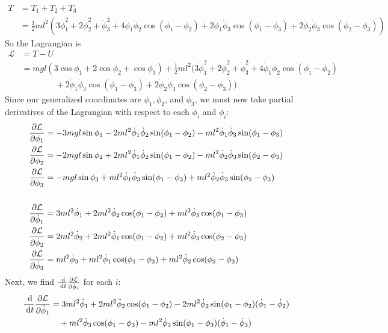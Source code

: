 \documentclass{article}
\renewcommand{\L}{\mathcal{L}}
\begin{document}
\begin{appendices}
\begin{align}
	T &= T_1 + T_2 + T_3 \\
	&= \frac{1}{2}ml^2 \left( 3\dot\phi_1^2+2\dot\phi_2^2+\dot\phi_3^2
	   + 4\dot\phi_1\dot\phi_2\cos(\phi_1-\phi_2)
	   + 2\dot\phi_1\dot\phi_3\cos(\phi_1-\phi_3)
	   + 2\dot\phi_2\dot\phi_3\cos(\phi_2-\phi_3) \right) 
\end{align}
So the Lagrangian is
\begin{align}
	\L &= T - U \\
	&= mgl\left(3\cos\phi_1+2\cos\phi_2+\cos\phi_3 \right) 
	   + \frac{1}{2}ml^2 \bigl( 3\dot\phi_1^2+2\dot\phi_2^2+\dot\phi_3^2
	   + 4\dot\phi_1\dot\phi_2\cos(\phi_1-\phi_2) \\
	&\qquad\qquad + 2\dot\phi_1\dot\phi_3\cos(\phi_1-\phi_3)
	   + 2\dot\phi_2\dot\phi_3\cos(\phi_2-\phi_3) \bigr) 
\end{align}
Since our generalized coordinates are $\phi_1,\phi_2$, and $\phi_3$, we must
now take partial derivatives of the Lagrangian with respect to each $\phi_i$
and $\dot\phi_i$:
\begin{align}
	\pD{\L}{\phi_1} &= -3mgl\sin\phi_1 
		-2ml^2\dot\phi_1\dot\phi_2\sin(\phi_1-\phi_2)
		-ml^2\dot\phi_1\dot\phi_3\sin(\phi_1-\phi_3) \\
	\pD{\L}{\phi_2} &= -2mgl\sin\phi_2 
		+2ml^2\dot\phi_1\dot\phi_2\sin(\phi_1-\phi_2)
		-ml^2\dot\phi_2\dot\phi_3\sin(\phi_2-\phi_3) \\
	\pD{\L}{\phi_3} &= -mgl\sin\phi_3 
		+ml^2\dot\phi_1\dot\phi_3\sin(\phi_1-\phi_3)
		+ml^2\dot\phi_2\dot\phi_3\sin(\phi_2-\phi_3) \\\\
	\pD{\L}{\dot\phi_1} &= 3ml^2\dot\phi_1 
		+ 2ml^2\dot\phi_2\cos(\phi_1-\phi_2) 
		+ ml^2\dot\phi_3\cos(\phi_1-\phi_3)  \\
	\pD{\L}{\dot\phi_2} &= 2ml^2\dot\phi_2 
		+ 2ml^2\dot\phi_1\cos(\phi_1-\phi_2) 
		+ ml^2\dot\phi_3\cos(\phi_2-\phi_3)  \\
	\pD{\L}{\dot\phi_3} &= ml^2\dot\phi_3 
		+ ml^2\dot\phi_1\cos(\phi_1-\phi_3) 
		+ ml^2\dot\phi_2\cos(\phi_2-\phi_3) 
\end{align}
Next, we find $\D{}{t}\pD{\L}{\dot\phi_i}$ for each $i$:
\begin{align}
	\D{}{t}\pD{\L}{\dot\phi_1} &= 3ml^2\ddot\phi_1 
		+ 2ml^2\ddot\phi_2\cos(\phi_1-\phi_2) 
		- 2ml^2\dot\phi_2\sin(\phi_1-\phi_2)(\dot\phi_1-\dot\phi_2) \\
		&\quad + ml^2\ddot\phi_3\cos(\phi_1-\phi_3) 
		- ml^2\dot\phi_3\sin(\phi_1-\phi_3)(\dot\phi_1-\dot\phi_3) \\\\

\end{align}
\end{appendices}
\end{document}
